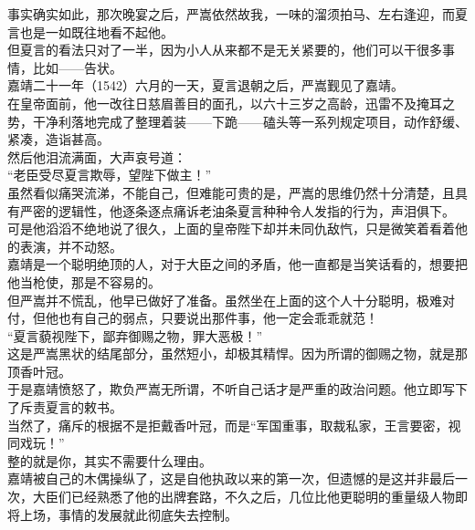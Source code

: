 \begin{multicols}{\theparacolNo}
事实确实如此，那次晚宴之后，严嵩依然故我，一味的溜须拍马、左右逢迎，而夏言也是一如既往地看不起他。\\

但夏言的看法只对了一半，因为小人从来都不是无关紧要的，他们可以干很多事情，比如——告状。\\

嘉靖二十一年（1542）六月的一天，夏言退朝之后，严嵩觐见了嘉靖。\\

在皇帝面前，他一改往日慈眉善目的面孔，以六十三岁之高龄，迅雷不及掩耳之势，干净利落地完成了整理着装——下跪——磕头等一系列规定项目，动作舒缓、紧凑，造诣甚高。\\

然后他泪流满面，大声哀号道：\\

“老臣受尽夏言欺辱，望陛下做主！”\\

虽然看似痛哭流涕，不能自己，但难能可贵的是，严嵩的思维仍然十分清楚，且具有严密的逻辑性，他逐条逐点痛诉老油条夏言种种令人发指的行为，声泪俱下。\\

可是他滔滔不绝地说了很久，上面的皇帝陛下却并未同仇敌忾，只是微笑着看着他的表演，并不动怒。\\

嘉靖是一个聪明绝顶的人，对于大臣之间的矛盾，他一直都是当笑话看的，想要把他当枪使，那是不容易的。\\

但严嵩并不慌乱，他早已做好了准备。虽然坐在上面的这个人十分聪明，极难对付，但他也有自己的弱点，只要说出那件事，他一定会乖乖就范！\\

“夏言藐视陛下，鄙弃御赐之物，罪大恶极！”\\

这是严嵩黑状的结尾部分，虽然短小，却极其精悍。因为所谓的御赐之物，就是那顶香叶冠。\\

于是嘉靖愤怒了，欺负严嵩无所谓，不听自己话才是严重的政治问题。他立即写下了斥责夏言的敕书。\\

当然了，痛斥的根据不是拒戴香叶冠，而是“军国重事，取裁私家，王言要密，视同戏玩！”\\

整的就是你，其实不需要什么理由。\\

嘉靖被自己的木偶操纵了，这是自他执政以来的第一次，但遗憾的是这并非最后一次，大臣们已经熟悉了他的出牌套路，不久之后，几位比他更聪明的重量级人物即将上场，事情的发展就此彻底失去控制。\\


\end{multicols}
